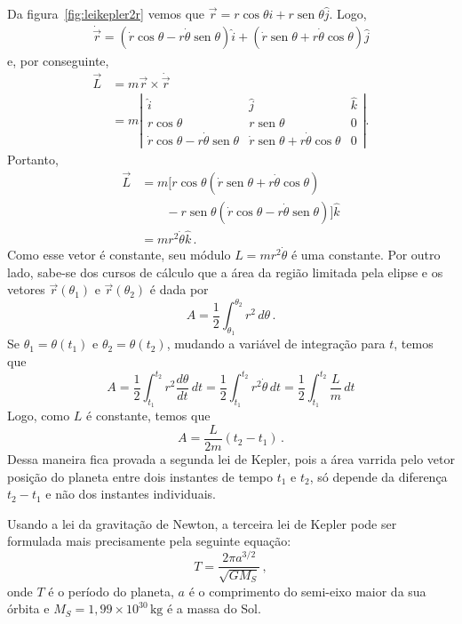 \documentclass[twocolumn=on,fontsize=12pt,DIV=calc]{scrartcl}
\theoremstyle{definition}
\DeclareMathOperator{\sen}{sen}
\begin{document}
Da figura~\ref{fig:leikepler2r} vemos que
$\vec r=r\cos\theta\hat i+r\sen\theta\hat j$. Logo,
\begin{equation*}
  \begin{split}
    \dot{\vec r}=(\dot r\cos\theta-r\dot\theta\sen\theta)\hat i+(\dot
    r\sen\theta+r\dot\theta\cos\theta)\hat j
  \end{split}
\end{equation*}
e, por conseguinte,
\begin{equation*}
  \begin{split}
    \vec L&=m\vec r\times\dot{\vec r}\\
    &=m\!\left|
      \begin{array}{ccc}
        \hat i&\hat j&\hat k\\
        r\cos\theta& r\sen\theta& 0\\
        \dot r\cos\theta\!-\!r\dot\theta\sen\theta& \dot r\sen\theta\!+\!r\dot\theta\cos\theta&0
      \end{array}
    \right|.
  \end{split}
\end{equation*}
Portanto,
\begin{equation*}
  \begin{split}
    \vec L&=m[r\cos\theta(\dot r\sen\theta+r\dot\theta\cos\theta)\\
    &\qquad-r\sen\theta(\dot r\cos\theta-r\dot\theta\sen\theta)]\hat k\\
    &=mr^2\dot\theta\hat k\,.
  \end{split}
\end{equation*}
Como esse vetor é constante, seu módulo $L=mr^2\dot\theta$ é uma
constante. Por outro lado, sabe-se dos cursos de cálculo que a área da
região limitada pela elipse e os vetores $\vec r(\theta_1)$ e
$\vec r(\theta_2)$ é dada por
$$A=\frac{1}{2}\int_{\theta_1}^{\theta_2}r^2\,d\theta\,.$$
Se $\theta_1=\theta(t_1)$ e $\theta_2=\theta(t_2)$, mudando a variável
de integração para $t$, temos que
$$A=\frac{1}{2}\int_{t_1}^{t_2}r^2\frac{d\theta}{dt}\,dt=\frac{1}{2}\int_{t_1}^{t_2}r^2\dot\theta\,dt=\frac{1}{2}\int_{t_1}^{t_2}\frac{L}{m}\,dt$$
Logo, como $L$ é constante, temos que
$$A=\frac{L}{2m}(t_2-t_1)\,.$$
Dessa maneira fica provada a segunda lei de Kepler, pois a área
varrida pelo vetor posição do planeta entre dois instantes de tempo
$t_1$ e $t_2$, só depende da diferença $t_2-t_1$ e não dos instantes
individuais.

Usando a lei da gravitação de Newton, a terceira lei de Kepler pode
ser formulada mais precisamente pela seguinte equação:
$$T=\frac{2\pi a^{3/2}}{\sqrt{GM_S}}\,,$$
onde $T$ é o período do planeta, $a$ é o comprimento do semi-eixo
maior da sua órbita e $M_S=1{,}99\times 10^{30}\,\mathrm{kg}$ é a
massa do Sol.
\end{document}
